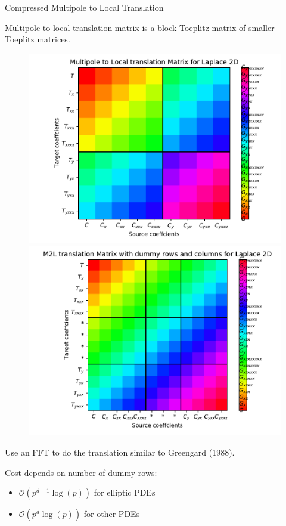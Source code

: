 \documentclass[10pt,usenames,dvipsnames]{beamer}
\begin{document}
\begin{frame}[fragile]{Compressed Multipole to Local Translation}

Multipole to local translation matrix is a block Toeplitz matrix of smaller Toeplitz matrices.

\begin{center}
\begin{figure}
\includegraphics[scale=0.3]{figures/m2l_imshow.pdf}
\pause
\includegraphics[scale=0.3]{figures/m2l_imshow_2.pdf}
\end{figure}
\end{center}

Use an FFT to do the translation similar to Greengard (1988).

Cost depends on number of dummy rows:
 \begin{itemize}
     \item $\mathcal{O}(p^{d-1}\log(p))$ for elliptic PDEs
     \item $\mathcal{O}(p^{d}\log(p))$ for other PDEs
 \end{itemize}
\end{frame}
\end{document}
